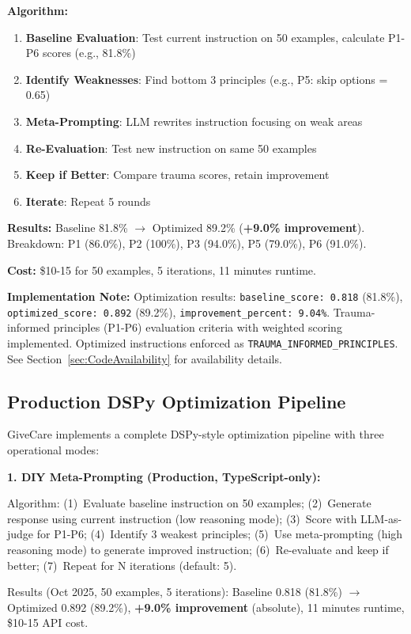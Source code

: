 \documentclass{article}
\begin{document}
\textbf{Algorithm:}
\begin{enumerate}
    \item \textbf{Baseline Evaluation}: Test current instruction on 50 examples, calculate P1-P6 scores (e.g., 81.8\%)
    \item \textbf{Identify Weaknesses}: Find bottom 3 principles (e.g., P5: skip options = 0.65)
    \item \textbf{Meta-Prompting}: LLM rewrites instruction focusing on weak areas
    \item \textbf{Re-Evaluation}: Test new instruction on same 50 examples
    \item \textbf{Keep if Better}: Compare trauma scores, retain improvement
    \item \textbf{Iterate}: Repeat 5 rounds
\end{enumerate}

\textbf{Results:} Baseline 81.8\% $\rightarrow$ Optimized 89.2\% (\textbf{+9.0\% improvement}). Breakdown: P1 (86.0\%), P2 (100\%), P3 (94.0\%), P5 (79.0\%), P6 (91.0\%).

\textbf{Cost:} \$10-15 for 50 examples, 5 iterations, 11 minutes runtime.

\textbf{Implementation Note:} Optimization results: \texttt{baseline\_score: 0.818} (81.8\%), \texttt{optimized\_score: 0.892} (89.2\%), \texttt{improvement\_percent: 9.04\%}. Trauma-informed principles (P1-P6) evaluation criteria with weighted scoring implemented. Optimized instructions enforced as \texttt{TRAUMA\_INFORMED\_PRINCIPLES}. See Section~\ref{sec:CodeAvailability} for availability details.

%
\subsection{Production DSPy Optimization Pipeline}%
\label{subsec:ProductionDSPyOptimizationPipeline}%
GiveCare implements a complete DSPy-style optimization pipeline with three operational modes:

\textbf{1. DIY Meta-Prompting (Production, TypeScript-only):}

Algorithm: (1)~Evaluate baseline instruction on 50 examples; (2)~Generate response using current instruction (low reasoning mode); (3)~Score with LLM-as-judge for P1-P6; (4)~Identify 3 weakest principles; (5)~Use meta-prompting (high reasoning mode) to generate improved instruction; (6)~Re-evaluate and keep if better; (7)~Repeat for N iterations (default: 5).

Results (Oct 2025, 50 examples, 5 iterations): Baseline 0.818 (81.8\%) $\rightarrow$ Optimized 0.892 (89.2\%), \textbf{+9.0\% improvement} (absolute), 11 minutes runtime, \$10-15 API cost.
\end{document}

